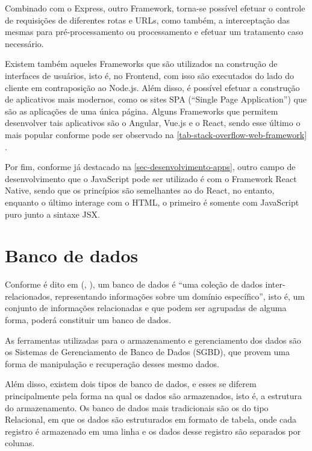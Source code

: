 Combinado com o Express, outro Framework, torna-se possível efetuar o controle de requisições de diferentes rotas e URLs, como também, a interceptação das mesmas para pré-processamento ou processamento e efetuar um tratamento caso necessário\cite{nodeJsMDN}.

Existem também aqueles Frameworks que são utilizados na construção de interfaces de usuários, isto é, no Frontend, com isso são executados do lado do cliente em contraposição ao Node.js. Além disso, é possível efetuar a construção de aplicativos mais modernos, como os sites SPA (``Single Page Application'') que são as aplicações de uma única página. Alguns Frameworks que permitem desenvolver tais aplicativos são o Angular, Vue.js e o React, sendo esse último o mais popular conforme pode ser observado na \autoref{tab-stack-overflow-web-framework}\cite{angularIntroduction} \cite{angularWiki} \cite{vueJsAbout} \cite{vueJsWiki} \cite{reactAbout} \cite{reactWiki}.

Por fim, conforme já destacado na \autoref{sec-desenvolvimento-apps}, outro campo de desenvolvimento que o JavaScript pode ser utilizado é com o Framework React Native, sendo que os princípios são semelhantes ao do React, no entanto, enquanto o último interage com o HTML, o primeiro é somente com JavaScript puro junto a sintaxe JSX\cite{reactNativeAbout}\cite{reactNativeWiki}.

\section{Banco de dados}

Conforme é dito em (\citeauthor{silberschatz2016sistema}, \citeyear{silberschatz2016sistema}), um banco de dados é ``uma coleção de dados inter-relacionados, representando informações sobre um domínio específico'', isto é, um conjunto de informações relacionadas e que podem ser agrupadas de alguma forma, poderá constituir um banco de dados.

As ferramentas utilizadas para o armazenamento e gerenciamento dos dados são os Sistemas de Gerenciamento de Banco de Dados (SGBD), que provem uma forma de manipulação e recuperação desses mesmo dados.

Além disso, existem dois tipos de banco de dados, e esses se diferem principalmente pela forma na qual os dados são armazenados, isto é, a estrutura do armazenamento. Os banco de dados mais tradicionais são os do tipo Relacional, em que os dados são estruturados em formato de tabela, onde cada registro é armazenado em uma linha e os dados desse registro são separados por colunas.


